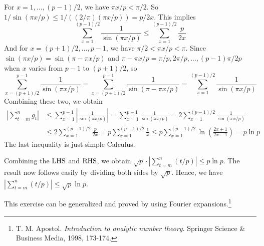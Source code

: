 \documentclass[../I&R.tex]{subfiles}
\begin{document}
For $x=1,\ldots,(p-1)/2$, we have $\pi x/p<\pi/2$. So $1/\sin(\pi x/p)\leq1/((2/\pi)(\pi x/p))=p/2x$. This implies $$\sum_{x=1}^{(p-1)/2} \frac{1}{\sin(\pi x/p)} \leq \sum_{x=1}^{(p-1)/2} \frac{p}{2x}$$
And for $x=(p+1)/2,\ldots,p-1$, we have $\pi/2<\pi x/p<\pi$. Since $\sin(\pi x/p)=\sin(\pi-\pi x/p)$ and $\pi-\pi x/p=\pi/p,2\pi/p,\ldots,(p-1)\pi/2p$ when $x$ varies from $p-1$ to $(p+1)/2$, so $$\sum_{x=(p+1)/2}^{p-1} \frac{1}{\sin(\pi x/p)}=\sum_{x=(p+1)/2}^{p-1} \frac{1}{\sin(\pi-\pi x/p)} = \sum_{x=1}^{(p-1)/2} \frac{1}{\sin(\pi x/p)}$$
Combining these two, we obtain
\begin{align*}
    \left|\sum_{t=m}^n g_t\right| &\leq \sum_{x=1}^{p-1} \left|\frac{1}{\sin(\pi x/p)}\right| = \sum_{x=1}^{p-1} \frac{1}{\sin(\pi x/p)} = 2\sum_{x=1}^{(p-1)/2} \frac{1}{\sin(\pi x/p)} \\
    &\leq 2\sum_{x=1}^{(p-1)/2} \frac{p}{2x} = p\sum_{x=1}^{(p-1)/2} \frac{1}{x} \leq p\sum_{x=1}^{(p-1)/2} \ln\left(\frac{2x+1}{2x-1}\right) = p\ln p
\end{align*}
The last inequality is just simple Calculus.

Combining the $\operatorname{LHS}$ and $\operatorname{RHS}$, we obtain $\sqrt{p}\cdot|\sum_{t=m}^n (t/p)|\leq p\ln p$. The result now follows easily by dividing both sides by $\sqrt{p}$. Hence, we have $|\sum_{t=m}^n (t/p)|\leq \sqrt{p}\ln p$.

This exercise can be generalized and proved by using Fourier expansions.\footnote{T. M. Apostol. \textit{Introduction to analytic number theory}. Springer Science \& Business Media, 1998, 173-174.}
\end{document}
